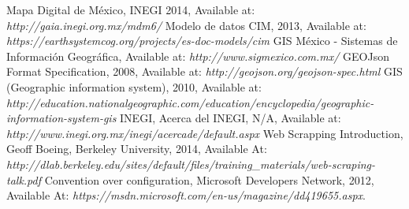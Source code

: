 \begin{thebibliography}{1}
		Mapa Digital de México, INEGI 2014, Available at: \emph{http://gaia.inegi.org.mx/mdm6/}
	   Modelo de datos CIM, 2013, Available at: \emph{https://earthsystemcog.org/projects/es-doc-models/cim}
		 GIS México - Sistemas de Información Geográfica, Available at: \emph{http://www.sigmexico.com.mx/}
	     GEOJson Format Specification, 2008, Available at: \emph{http://geojson.org/geojson-spec.html}
		 GIS (Geographic information system), 2010, Available at: \emph{http://education.nationalgeographic.com/education/encyclopedia/geographic-information-system-gis}
		INEGI, Acerca del INEGI, N/A, Available at: \emph{http://www.inegi.org.mx/inegi/acercade/default.aspx}
		Web Scrapping Introduction, Geoff Boeing, Berkeley University, 2014, Available At: \emph{http://dlab.berkeley.edu/sites/default/files/training\_materials/web-scraping-talk.pdf}
		Convention over configuration, Microsoft Developers Network, 2012, Available At: \emph{https://msdn.microsoft.com/en-us/magazine/dd419655.aspx}.
\end{thebibliography}